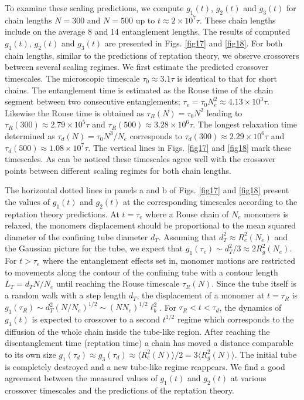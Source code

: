 \documentclass[pre,showpacs,notitlepage,twocolumn]{revtex4-1}
\begin{document}
  
  To examine these scaling predictions, we compute $g_1(t)$, $g_2(t)$ and $g_3(t)$ for   chain lengths $N=300$ and $N=500$   up  to $t \approx 2 \times 10^7 \tau$. These chain lengths include   on the average 8  and 14 entanglement lengths.
 The results of computed $g_1(t)$, $g_2(t)$ and $g_3(t)$  are presented in  Figs. \ref{fig17} and  \ref{fig18}. 
 For both chain lengths, similar to the predictions of reptation theory, we observe crossovers between several scaling regimes. 
 We first estimate the predicted crossover timescales.
The microscopic timescale  $\tau_0 \approx 3.1 \tau $ is identical to that for short chains.
 The entanglement time is estimated as the Rouse time of the chain segment between two consecutive entanglements;  $\tau_e = \tau_0 N_e^2 \approx 4.13 \times 10^3 \tau$. Likewise the Rouse time is obtained as $\tau_R(N) = \tau_0 N ^2$ leading to $\tau_R(300)\approx 2.79 \times 10^5 \tau$ and $\tau_R(500) \approx 3.28 \times 10^6 \tau$. The longest relaxation time   determined as $\tau_d(N) = \tau_0 N^3/N_e$ corresponds to $\tau_d(300)\approx 2.29 \times 10^6 \tau$ and
 $\tau_d(500)\approx 1.08 \times 10^7 \tau$. The vertical lines in Figs. \ref{fig17} and  \ref{fig18} mark these  timescales. 
 As can be noticed these timescales agree well with the crossover points between  different scaling regimes  for both chain lengths. 
 
  The horizontal dotted lines in  panels a and b   of Figs. \ref{fig17} and  \ref{fig18} present the  values of  $g_1(t)$ and $g_2(t)$ at the corresponding
timescales according to the reptation theory predictions. At $t=\tau_e$ where a Rouse chain of $N_e$
monomers is relaxed, the monomers displacement should be proportional to the mean squared diameter of the confining tube diameter $d_T$. Assuming that $d_T^2 \approx R_e^2(N_e)$ and  the Gaussian picture for the tube, we expect that 
$g_1(\tau_e)\sim d_T^2/3 \approx 2R_g^2(N_e) $.  For $t>\tau_e$ where the entanglement effects set in,  monomer  motions are restricted to movements along the contour of  the confining tube with a contour length $L_T=d_T N/N_e$ until reaching the Rouse timescale $\tau_R (N)$. Since the tube itself is a random walk with a step length $d_T$, the displacement of a monomer at $t=\tau_R$ is  $g_1(\tau_R)\sim d_T^2 (N/N_e)^{1/2} \sim   (N N_e)^{1/2} \ell_b^2$. For $ \tau_R < t < \tau_d$,  the dynamics of $g_1(t)$ is expected to crossover to a second $t^{1/2}$ regime which corresponds to the diffusion of  the whole chain  inside  the tube-like region.   After reaching the disentanglement time (reptation
time) a chain has moved a distance comparable to its own size $g_1(\tau_d)\approx  g_3(\tau_d) \approx \langle R^2_e(N)\rangle/2= 3\langle R^2_g(N)\rangle$. The initial tube is completely destroyed and a new tube-like regime reappears. We find  a good agreement between the measured  values of $g_1(t)$ and $g_2(t)$ at various crossover timescales and  the predictions of the reptation theory.
\end{document}
